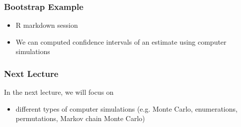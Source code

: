 \documentclass[10pt]{beamer}
\begin{document}
\begin{frame}
\frametitle{Bootstrap Example}

\begin{itemize}
\item R markdown session
\item We can computed confidence intervals of an estimate using computer simulations
\end{itemize}

\end{frame}

\begin{frame}
\frametitle{Next Lecture}

In the next lecture, we will focus on
\begin{itemize}
\item different types of computer simulations (e.g. Monte Carlo, enumerations, permutations, Markov chain Monte Carlo)
\end{itemize}

\end{frame}
\end{document}

